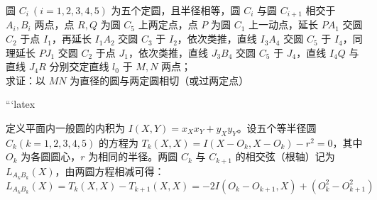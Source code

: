 \begin{exercise}
圆 \(C_i\ (i=1,2,3,4,5)\) 为五个定圆，且半径相等，圆 \(C_i\) 与圆 \(C_{i+1}\) 相交于 \(A_i, B_i\) 两点，点 \(R, Q\) 为圆 \(C_5\) 上两定点，点 \(P\) 为圆 \(C_1\) 上一动点，延长 \(PA_1\) 交圆 \(C_2\) 于点 \(I_1\)，再延长 \(I_1A_2\) 交圆 \(C_3\) 于 \(I_2\)，依次类推，直线 \(I_3A_4\) 交圆 \(C_5\) 于 \(I_4\)，同理延长 \(PJ_1\) 交圆 \(C_2\) 于点 \(J_1\)，依次类推，直线 \(J_3B_4\) 交圆 \(C_5\) 于 \(J_4\)，直线 \(I_4Q\) 与直线 \(J_4R\) 分别交定直线 \(l_0\) 于 \(M, N\) 两点；\\
求证：以 \(MN\) 为直径的圆与两定圆相切（或过两定点）
\end{exercise}
```latex
\begin{solution}
定义平面内一般圆的内积为 $I(X,Y) = x_X x_Y + y_X y_Y$。设五个等半径圆 $C_k (k=1,2,3,4,5)$ 的方程为 $T_k(X,X) = I(X-O_k, X-O_k) - r^2 = 0$，其中 $O_k$ 为各圆圆心，$r$ 为相同的半径。两圆 $C_k$ 与 $C_{k+1}$ 的相交弦（根轴）记为 $L_{A_k B_k}(X)$，由两圆方程相减可得：
$$ L_{A_k B_k}(X) = T_k(X,X) - T_{k+1}(X,X) = -2I(O_k - O_{k+1}, X) + (O_k^2 - O_{k+1}^2) $$


\end{solution}
